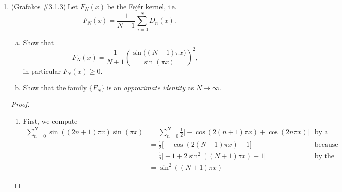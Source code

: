 \documentclass[a4paper]{article}
\begin{document}
\begin{enumerate}
\begin{proof}
\begin{enumerate}
      Now we integrate
      \begin{align*}
        \int_{\frac{k}{2N+1}}^{\frac{k+1}{2N+1}} \sin \left( (2N+1) \pi x \right) dx &= \frac{1}{(2N+1)\pi} \int_{k \pi}^{ (k+1) \pi } \sin y dy \\
        &= \frac{-1}{(2N+1) \pi} \cos y \big|_{k\pi}^{(k+1)\pi} \\
        &= (-1)^k \frac{2}{(2N+1) \pi}
      \end{align*}

      Therefore,
      \[ \| D_N \|_1 \geq \frac{2}{\pi^2} \sum_{k=0}^{2N} \frac{1}{k+1} \geq \frac{2}{\pi^2} \log (2N) .\]

  \end{enumerate}

\end{proof}

\item (Grafakos \#3.1.3) Let $F_N (x)$ be the Fej\'{e}r  kernel, i.e. $$ F_N (x) = \frac1{N+1} \sum_{n=0}^N D_n (x). $$

\begin{enumerate}[(a)]
\item Show that $$ F_N (x)  = \frac{1}{N+1} \left( \frac{\sin \big( (N+1) \pi x\big)}{ \sin (\pi x)} \right)^2 , $$ in particular $F_N (x) \ge 0$.
\item Show that the family $\{ F_N \}$ is an {\it{approximate identity}} as $N\rightarrow \infty$.

\end{enumerate}

\begin{proof}
  \begin{enumerate}
    \item
      First, we compute
      \begin{align}
        \sum_{n=0}^N \sin \left( (2n+1) \pi x \right) \sin ( \pi x ) &= \sum_{n=0}^N \frac{1}{2} \big[ - \cos \left( 2 (n+1) \pi x \right) + \cos
        \left( 2 n \pi x \right) \big] &\text{by a product identity} \nonumber \\
        &= \frac{1}{2} \big[ - \cos \left( 2(N+1) \pi x \right) + 1 \big] &\text{because our sum telescopes} \nonumber \\
        &= \frac{1}{2} \big[ - 1 + 2 \sin^2 \left( (N+1) \pi x \right) + 1 \big] &\text{by the double-angle formula} \nonumber \\
        &= \sin^2 \left( (N+1) \pi x \right)
        \label{eqn:trig_prod}
      \end{align}


\end{enumerate}
\end{proof}
\end{enumerate}
\end{document}
